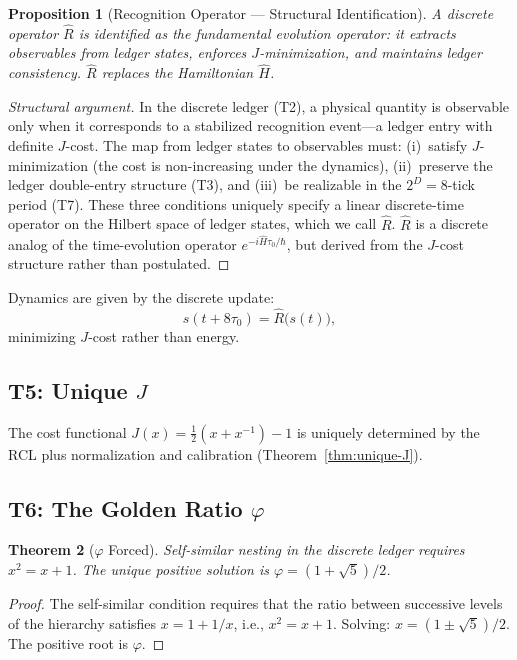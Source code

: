 \documentclass[12pt,a4paper]{article}
\newtheorem{theorem}{Theorem}[section]
\newtheorem{proposition}[theorem]{Proposition}
\theoremstyle{definition}
\theoremstyle{remark}
\begin{document}
\begin{proposition}[Recognition Operator --- Structural Identification]
A discrete operator $\widehat{R}$ is identified as the fundamental
evolution operator: it extracts observables from ledger states, enforces
$J$-minimization, and maintains ledger consistency.  $\widehat{R}$
replaces the Hamiltonian $\widehat{H}$.
\end{proposition}

\begin{proof}[Structural argument]
In the discrete ledger (T2), a physical quantity is observable only
when it corresponds to a stabilized recognition event---a ledger entry
with definite $J$-cost.  The map from ledger states to observables
must: (i)~satisfy $J$-minimization (the cost is non-increasing under
the dynamics), (ii)~preserve the ledger double-entry structure (T3),
and (iii)~be realizable in the $2^D = 8$-tick period (T7).  These
three conditions uniquely specify a linear discrete-time operator on
the Hilbert space of ledger states, which we call $\widehat{R}$.
$\widehat{R}$ is a discrete analog of the time-evolution operator
$e^{-i\widehat{H}\tau_0/\hbar}$, but derived from the $J$-cost structure
rather than postulated.
\end{proof}

Dynamics are given by the discrete update:
\begin{equation}
  s(t + 8\tau_0) = \widehat{R}\bigl(s(t)\bigr),
\end{equation}
minimizing $J$-cost rather than energy.

\subsection{T5: Unique $J$}

The cost functional $J(x) = \tfrac{1}{2}(x + x^{-1}) - 1$ is uniquely
determined by the RCL plus normalization and calibration
(Theorem~\ref{thm:unique-J}).

\subsection{T6: The Golden Ratio $\varphi$}

\begin{theorem}[$\varphi$ Forced]
Self-similar nesting in the discrete ledger requires $x^2 = x + 1$.
The unique positive solution is $\varphi = (1+\sqrt{5})/2$.
\end{theorem}

\begin{proof}
The self-similar condition requires that the ratio between successive
levels of the hierarchy satisfies $x = 1 + 1/x$, i.e., $x^2 = x + 1$.
Solving: $x = (1 \pm \sqrt{5})/2$.  The positive root is $\varphi$.
\end{proof}
\end{document}
